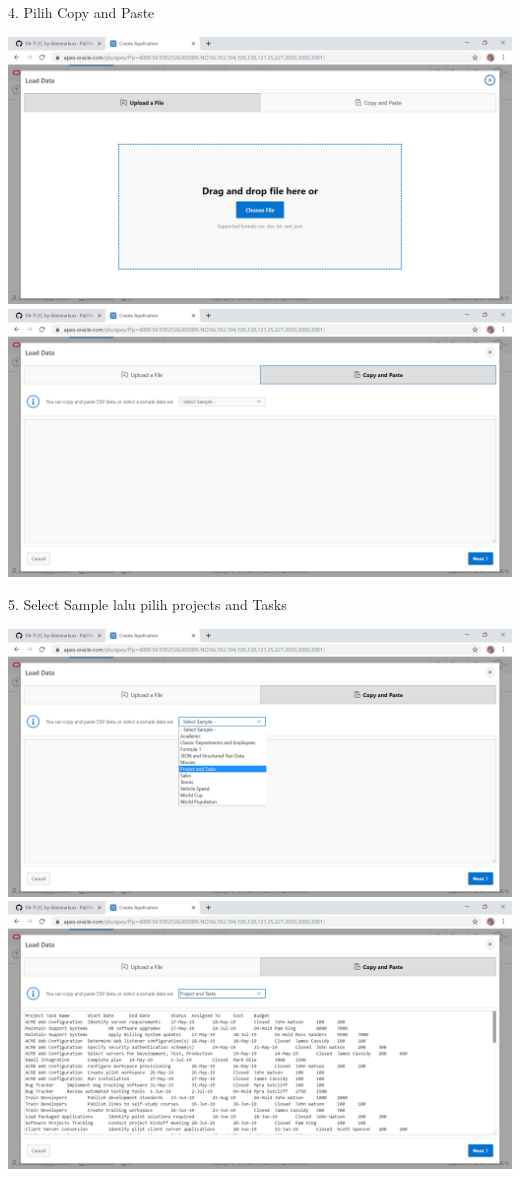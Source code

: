 \documentclass{article}
\begin{document}
    \newpage
    \item 4. Pilih Copy and Paste
\begin{center}
    \includegraphics[width=10cm\textwidth]{gambar/4.png}
    \includegraphics[width=10cm\textwidth]{gambar/5.png}
    \end{center}
    \newpage
    \item 5. Select Sample lalu pilih projects and Tasks
\begin{center}
    \includegraphics[width=10cm\textwidth]{gambar/6.png}
    \includegraphics[width=10cm\textwidth]{gambar/7.png}
\end{center}
    
\end{document}
